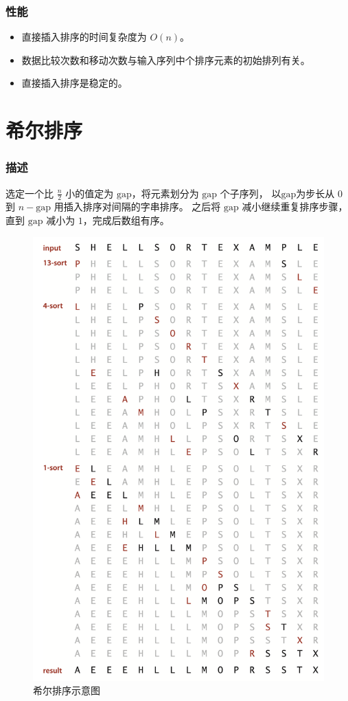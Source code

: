 \subsubsection{性能}
\begin{itemize}
    \item 直接插入排序的时间复杂度为 $O(n)$。
    \item 数据比较次数和移动次数与输入序列中个排序元素的初始排列有关。
    \item 直接插入排序是稳定的。
\end{itemize}

\section{希尔排序}

\subsubsection{描述}
选定一个比 $\frac{n}{2}$ 小的值定为 $\text{gap}$，将元素划分为 $\text{gap}$ 个子序列，%
以$\text{gap}$为步长从 $0$ 到 $n - \text{gap}$ 用插入排序对间隔的字串排序。%
之后将 $\text{gap}$ 减小继续重复排序步骤，直到 $\text{gap}$ 减小为 $1$，完成后数组有序。


\begin{figure}[H]
    \centering
    \includegraphics[width=12.5cm]{src/shellString.png}
    \caption{希尔排序示意图}
\end{figure}

